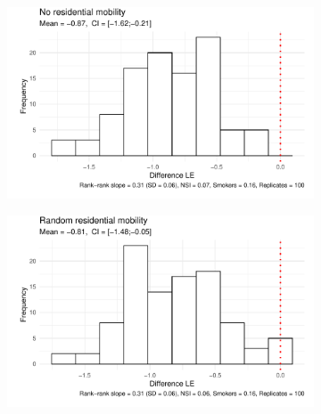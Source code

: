 \begin{figure}[htp]
    \caption{Micro-simulated life expectancy (LE) differences for the\newline rank-rank slope effect on smoking using transition matrices as counterfactual} \label{ch04:microsimulation_transmob}\vspace{5mm}
     \centering
     \begin{subfigure}[b]{0.60\textwidth}
         \centering
         \includegraphics[width=\textwidth]{plots/microsimulation-transmob/microsimulation_transmob_1.pdf}
     \end{subfigure}\vspace{5mm}
     \begin{subfigure}[b]{0.60\textwidth}
         \centering
         \includegraphics[width=\textwidth]{plots/microsimulation-transmob/microsimulation_transmob_2.pdf}
     \end{subfigure}\vspace{5mm}

\end{figure}
